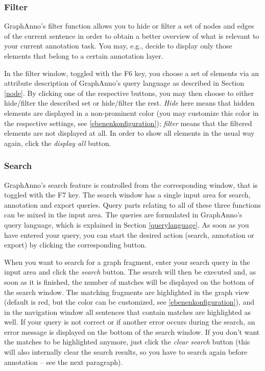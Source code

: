 \documentclass[12pt]{scrartcl}
\begin{document}
\subsubsection{Filter}

GraphAnno’s filter function allows you to hide or filter a set of nodes and edges of the current sentence in order to obtain a better overview of what is relevant to your current annotation task.
You may, e.g., decide to display only those elements that belong to a certain annotation layer.

In the filter window, toggled with the F6 key, you choose a set of elements via an attribute description of GraphAnno’s query language as described in Section \ref{node}.
By clicking one of the respective buttons, you may then choose to either hide/filter the described set or hide/filter the rest.
\textit{Hide} here means that hidden elements are displayed in a non-prominent color (you may customize this color in the respective settings, see \ref{ebenenkonfiguration}); \textit{filter} means that the filtered elements are not displayed at all.
In order to show all elements in the usual way again, click the \textit{display all} button.

\subsubsection{Search}\label{window-search}

GraphAnno’s search feature is controlled from the corresponding window, that is toggled with the F7 key.
The search window has a single input area for search, annotation and export queries.
Query parts relating to all of these three functions can be mixed in the input area.
The queries are formulated in GraphAnno’s query language, which is explained in Section \ref{querylanguage}.
As soon as you have entered your query, you can start the desired action (search, annotation or export) by clicking the corresponding button.

When you want to search for a graph fragment, enter your search query in the input area and click the \textit{search} button.
The search will then be executed and, as soon as it is finished, the number of matches will be displayed on the bottom of the search window.
The matching fragments are highlighted in the graph view (default is red, but the color can be customized, see \ref{ebenenkonfiguration}), and in the navigation window all sentences that contain matches are highlighted as well.
If your query is not correct or if another error occurs during the search, an error message is displayed on the bottom of the search window.
If you don’t want the matches to be highlighted anymore, just click the \textit{clear search} button (this will also internally clear the search results, so you have to search again before annotation – see the next paragraph).
\end{document}
